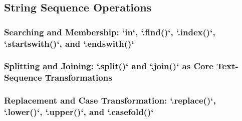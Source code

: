 \subsection{String Sequence Operations}
\subsubsection{Searching and Membership: `in`, `.find()`, `.index()`, `.startswith()`, and `.endswith()`}
\subsubsection{Splitting and Joining: `.split()` and `.join()` as Core Text-Sequence Transformations}
\subsubsection{Replacement and Case Transformation: `.replace()`, `.lower()`, `.upper()`, and `.casefold()`}
